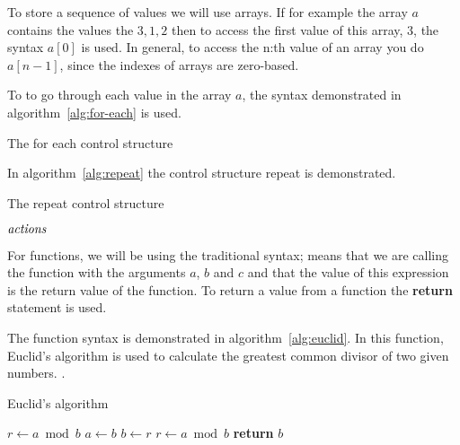 To store a sequence of values we will use arrays. If for example the
array $a$ contains the values the $3,1,2$ then to access the first
value of this array, $3$, the syntax $a[0]$ is used. In general, to
access the n:th value of an array you do $a[n-1]$, since the indexes
of arrays are zero-based.

To to go through each value in the array $a$, the syntax demonstrated
in algorithm~\ref{alg:for-each} is used.

\begin{algorithm}[H]
  \caption{The for each control structure}
  \label{alg:for-each}
  \begin{algorithmic}[1]
    \EndForEach
  \end{algorithmic}
\end{algorithm}

In algorithm~\ref{alg:repeat} the control structure repeat is
demonstrated.

\begin{algorithm}[H]
  \caption{The repeat control structure}
  \label{alg:repeat}
  \begin{algorithmic}[1]
    \State $\mathit{actions}$ 
    \EndRepeatn
  \end{algorithmic}
\end{algorithm}

For functions, we will be using the traditional syntax;
 means that we are calling the function
 with the arguments $a$, $b$ and $c$ and that the value
of this expression is the return value of the function. To return a
value from a function the \textbf{return} statement is used.

The function syntax is demonstrated in algorithm~\ref{alg:euclid}. In
this function, Euclid's algorithm is used to calculate the greatest
common divisor of two given numbers.
\cite{cormen2009introduction_to_algo,weisstein:_euclid_algor}.

\begin{algorithm}
  \caption{Euclid's algorithm}
  \label{alg:euclid}
  \begin{algorithmic}[1]
    \State $r\gets a\bmod b$
    \State $a\gets b$
    \State $b\gets r$
    \State $r\gets a\bmod b$
    \EndWhile
    \State \textbf{return} $b$
    \EndProcedure
  \end{algorithmic}
\end{algorithm}


